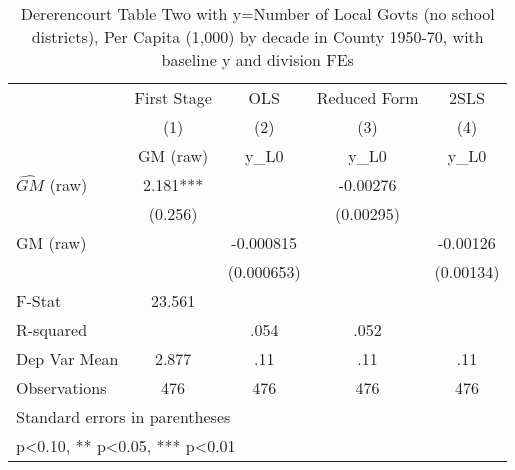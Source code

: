 \begin{table}[htbp]\centering
\def\sym#1{\ifmmode^{#1}\else\(^{#1}\)\fi}
\caption{Dererencourt Table Two with y=Number of Local Govts (no school districts), Per Capita (1,000) by decade in County 1950-70, with baseline y and division FEs}
\begin{tabular}{l*{4}{c}}
\toprule
                    & First Stage   &         OLS   &Reduced Form   &        2SLS   \\
                    &\multicolumn{1}{c}{(1)}&\multicolumn{1}{c}{(2)}&\multicolumn{1}{c}{(3)}&\multicolumn{1}{c}{(4)}\\
                    &\multicolumn{1}{c}{GM  (raw)}&\multicolumn{1}{c}{y\_L0}&\multicolumn{1}{c}{y\_L0}&\multicolumn{1}{c}{y\_L0}\\
\midrule
$\hat{GM}$ (raw)    &       2.181***&               &    -0.00276   &               \\
                    &     (0.256)   &               &   (0.00295)   &               \\
\addlinespace
GM  (raw)           &               &   -0.000815   &               &    -0.00126   \\
                    &               &  (0.000653)   &               &   (0.00134)   \\
\midrule
F-Stat              &      23.561   &               &               &               \\
R-squared           &               &        .054   &        .052   &               \\
Dep Var Mean        &       2.877   &         .11   &         .11   &         .11   \\
Observations        &         476   &         476   &         476   &         476   \\
\bottomrule
\multicolumn{5}{l}{\footnotesize Standard errors in parentheses}\\
\multicolumn{5}{l}{\footnotesize * p<0.10, ** p<0.05, *** p<0.01}\\
\end{tabular}
\end{table}
